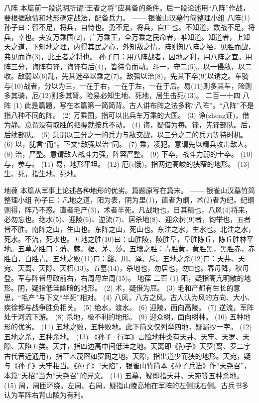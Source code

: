 \documentclass[12pt,UTF8]{ctexbook}
\begin{document}
八阵
本篇前一段说明所谓“王者之将”应具备的条件。后一段论述用“八阵”作战，要根据敌情和地形确定战法，配备兵力。
—— 银雀山汉墓竹简整理小组
八阵(1)
孙子曰：智不足，将兵，自恃也。勇不足，将兵，自广也。不知道，数战不足，将兵，幸也。夫安万乘国(2)，广万乘王，全万乘之民命者，唯知道。知道者，上知天之道，下知地之理，内得其民之心，外知敌之情，阵则知八阵之经，见胜而战，弗见而诤(3)，此王者之将也。
孙子曰：用八阵战者，因地之利，用八阵之宜。用阵三分，诲阵有锋，诲锋有后(4)，皆待令而动。斗一，守二(5)。以一侵敌，以二收。敌弱以(6)乱，先其选卒以乘之(7)。敌强以治(8)，先其下卒(9)以诱之。车骑与(10)战者，分以为三，一在于右，一在于左，一在于后。易(11)则多其车，险则多其骑，厄(12)则多其弩。险易必知生地、死地，居生击死(13)。
二百一十四 八阵
(1) 此是篇题，写在本篇第一简简背。古人讲布阵之法多称“八阵”。“八阵”不是指八种不同的阵。
(2) 万乘国，指可以出兵车万乘的大国。
(3) 诤(zheng证)，借为静。意谓没有取胜的把握就按兵不动。
(4) 诲，疑借为每。锋，先锋部队。后，后续部队。
(5) 意谓以三分之一的兵力与敌交战，以三分之二的兵力等待时机。
(6) 以，犹言“而”。下文“敌强以治”同。
(7) 乘，凌犯。意谓先以精兵攻击敌人。
(8) 治，严整。意谓敌人战斗力强，阵容严整。
(9) 下卒，战斗力弱的士卒。
(10) 与，参与。
(11) 易，地形平坦。
(12) 厄(e饿)，指两边高峻的狭窄的地形。
(13) 生、死，指生地、死地。

地葆
本篇从军事上论述各种地形的优劣。篇题原写在篇末。
—— 银雀山汉墓竹简整理小组
孙子曰：凡地之道，阳为表，阴为里(1)，直者为纲，术(2)者为纪。纪纲则得，阵乃不惑。直者毛产(3)，术者半死。凡战地也，日其精也，八风(4)将来，必勿忘也。绝水(5)、迎陵(6)、逆流(7)、居杀地(8)、迎众树(9)者，钧举也，五者皆不胜。南阵之山，生山也。东阵之山，死山也。东注之水，生水也。北注之水，死水。不流，死水也。五地之胜(10)曰：山胜陵，陵胜阜，阜胜陈丘，陈丘胜林平地。五草之胜曰：藩、棘、椐、茅、莎。五壤之胜：青胜黄，黄胜黑，黑胜赤，赤胜白，白胜青。五地之败(11)曰：谿、川、泽、斥。五地之杀(12)曰：天井、天宛、天离、天隙、天柖(13)。五墓(14)，杀地也，勿居也，勿□也。春毋降，秋毋登。军与阵皆毋政前右，右周毋左周(15)。
地葆 二百
(1) 阳，疑指高亢明敞的地形。阴，疑指低洼幽暗的地形。
(2) 术，疑借为屈。
(3) 毛和产都有生长的意思，“毛产”与下文“半死”相对。
(4) 八风，八方之风。古人认为风的方向、大小、疾徐都与战争胜负相关。
(5) 绝水，渡水。
(6) 迎陵，面向高陵。
(7) 逆流，军阵处于河流下游。
(8) 杀地，极不利的地形。
(9) 迎众树，面向树林。
(10) 五种地形的优劣。
(11) 五地之败，五种败地。此下简文仅列举四地，疑漏抄一字。
(12) 五地之杀，五种杀地。
(13) 《孙子·行军》言险地种类有天井、天牢、天罗、天隙、天陷五类。天井，指四边高中间低洼之地。天离即《孙子》天罗(离、罗二宇古代音近通用)，指草木茂密如罗网之地。天隙，指出道少而狭的地形。天宛，疑与《孙子》天牢相当。《孙子》“天陷”，银雀山竹简本《孙子兵法》作“天{尧召}”，本篇“天柖”当为“天{尧召}”的异文。
(14) 五墓，疑即指天井、天宛等五种杀地。
(15) 周，周匝环绕。左周、右周，疑指山陵高地在军阵的左侧或右侧。古兵书多认为军阵右背山陵为有利。
\end{document}
